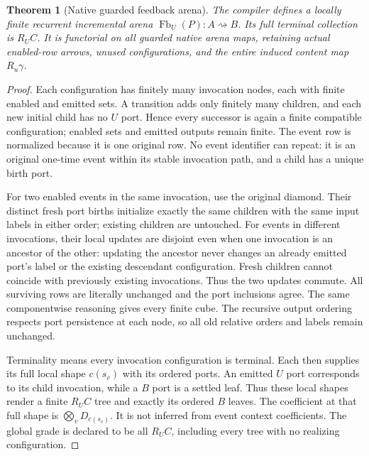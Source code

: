 \documentclass[11pt]{article}
\newtheorem{theorem}{Theorem}\newtheorem{proposition}[theorem]{Proposition}
\begin{document}
\begin{theorem}[Native guarded feedback arena]
The compiler defines a locally finite recurrent incremental arena $\operatorname{Fb}_U(P):A\rightsquigarrow B$. Its full terminal collection is $R_UC$. It is functorial on all guarded native arena maps, retaining actual enabled-row arrows, unused configurations, and the entire induced content map $R_u\gamma$.
\end{theorem}
\begin{proof}
Each configuration has finitely many invocation nodes, each with finite enabled and emitted sets. A transition adds only finitely many children, and each new initial child has no $U$ port. Hence every successor is again a finite compatible configuration; enabled sets and emitted outputs remain finite. The event row is normalized because it is one original row. No event identifier can repeat: it is an original one-time event within its stable invocation path, and a child has a unique birth port.

For two enabled events in the same invocation, use the original diamond. Their distinct fresh port births initialize exactly the same children with the same input labels in either order; existing children are untouched. For events in different invocations, their local updates are disjoint even when one invocation is an ancestor of the other: updating the ancestor never changes an already emitted port's label or the existing descendant configuration. Fresh children cannot coincide with previously existing invocations. Thus the two updates commute. All surviving rows are literally unchanged and the port inclusions agree. The same componentwise reasoning gives every finite cube. The recursive output ordering respects port persistence at each node, so all old relative orders and labels remain unchanged.

Terminality means every invocation configuration is terminal. Each then supplies its full local shape $c(s_v)$ with its ordered ports. An emitted $U$ port corresponds to its child invocation, while a $B$ port is a settled leaf. Thus these local shapes render a finite $R_UC$ tree and exactly its ordered $B$ leaves. The coefficient at that full shape is $\bigotimes_vD_{c(s_v)}$. It is not inferred from event context coefficients. The global grade is declared to be all $R_UC$, including every tree with no realizing configuration.


\end{proof}
\end{document}
